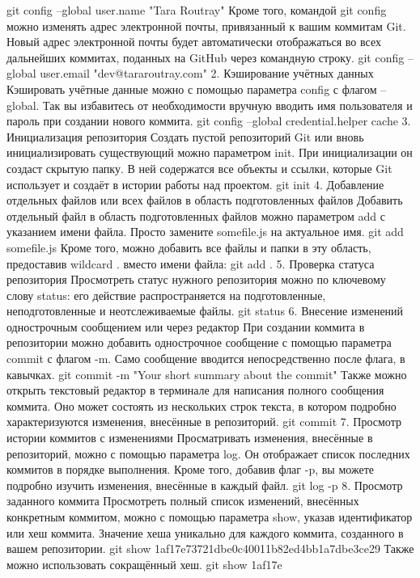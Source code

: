 {{{{{{{{{{{{{{{{{{{{git config --global user.name "Tara Routray"
Кроме того, командой git config можно изменять адрес электронной почты, привязанный к вашим коммитам Git. Новый адрес электронной почты будет автоматически отображаться во всех дальнейших коммитах, поданных на GitHub через командную строку.
git config --global user.email "dev@tararoutray.com"
2. Кэширование учётных данных
Кэшировать учётные данные можно с помощью параметра config с флагом --global. Так вы избавитесь от необходимости вручную вводить имя пользователя и пароль при создании нового коммита.
git config --global credential.helper cache
3. Инициализация репозитория
Создать пустой репозиторий Git или вновь инициализировать существующий можно параметром init. При инициализации он создаст скрытую папку. В ней содержатся все объекты и ссылки, которые Git использует и создаёт в истории работы над проектом.
git init
4. Добавление отдельных файлов или всех файлов в область подготовленных файлов
Добавить отдельный файл в область подготовленных файлов можно параметром add с указанием имени файла. Просто замените somefile.js на актуальное имя.
git add somefile.js
Кроме того, можно добавить все файлы и папки в эту область, предоставив wildcard . вместо имени файла:
git add .
5. Проверка статуса репозитория
Просмотреть статус нужного репозитория можно по ключевому слову status: его действие распространяется на подготовленные, неподготовленные и неотслеживаемые файлы.
git status
6. Внесение изменений однострочным сообщением или через редактор
При создании коммита в репозитории можно добавить однострочное сообщение с помощью параметра commit с флагом -m. Само сообщение вводится непосредственно после флага, в кавычках.
git commit -m "Your short summary about the commit"
Также можно открыть текстовый редактор в терминале для написания полного сообщения коммита. Оно может состоять из нескольких строк текста, в котором подробно характеризуются изменения, внесённые в репозиторий.
git commit
7. Просмотр истории коммитов с изменениями
Просматривать изменения, внесённые в репозиторий, можно с помощью параметра log. Он отображает список последних коммитов в порядке выполнения. Кроме того, добавив флаг -p, вы можете подробно изучить изменения, внесённые в каждый файл.
git log -p
8. Просмотр заданного коммита
Просмотреть полный список изменений, внесённых конкретным коммитом, можно с помощью параметра show, указав идентификатор или хеш коммита. Значение хеша уникально для каждого коммита, созданного в вашем репозитории.
git show 1af17e73721dbe0c40011b82ed4bb1a7dbe3ce29
Также можно использовать сокращённый хеш.
git show 1af17e
}}}}}}}}}}}}}}}}}}}}
